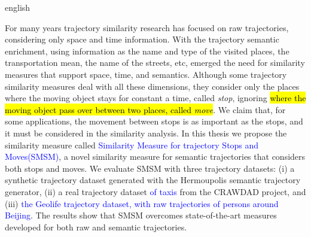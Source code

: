 {
    \begin{otherlanguage*}{english}
    \begin{resumo}[Abstract]

        For many years trajectory similarity research has focused on raw trajectories, considering only space and time information. With the trajectory semantic enrichment, using information as the name and type of the visited places, the transportation mean, the name of the streets, etc,  emerged the need for similarity measures that support space, time, and semantics. Although some trajectory similarity measures deal with all these dimensions, they consider only the places where the moving object stays for constant a time, called \emph{stop}, ignoring \hl{where the moving object pass over between two places, called \emph{move}}. We claim that, for some applications, the movement between stops is as important as the stops, and it must be considered in the similarity analysis.
        In this thesis we propose the similarity measure called \textcolor{blue}{Similarity Measure for trajectory Stops and Moves(SMSM)}, a novel similarity measure for semantic trajectories that considers both stops and moves.
        We evaluate SMSM with three trajectory datasets: (i) a synthetic trajectory dataset generated with the Hermoupolis semantic trajectory generator, (ii) a real trajectory dataset \textcolor{blue}{of taxis} from the CRAWDAD project, and (iii) \textcolor{blue}{the Geolife trajectory dataset, with raw trajectories of persons around Beijing}. The results show that SMSM overcomes state-of-the-art measures developed for both raw and semantic trajectories.


    \end{resumo}
    \end{otherlanguage*}
}